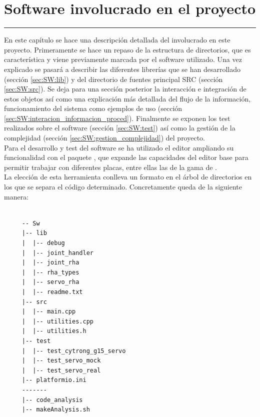 \chapter{Software involucrado en el proyecto} \label{chap:SW}
\hrule
\vspace{3mm}

    En este capítulo se hace una descripción detallada del  involucrado en este proyecto. Primeramente se hace un repaso de la estructura de directorios, que es característica y viene previamente marcada por el software utilizado. Una vez explicado se pasará a describir las diferentes librerías que se han desarrollado (sección \ref{sec:SW:lib}) y del directorio de fuentes principal SRC (sección \ref{sec:SW:src}). Se deja para una sección posterior la interacción e integración de estos objetos así como una explicación más detallada del flujo de la información, funcionamiento del sistema como ejemplos de uso (sección \ref{sec:SW:interacion_informacion_proced}). Finalmente se exponen los test realizados sobre el software (sección \ref{sec:SW:test}) así como la gestión de la complejidad (sección \ref{sec:SW:gestion_complejidad}) del proyecto.
    \\ 

    Para el desarrollo y test del software se ha utilizado el editor  ampliando su funcionalidad con el paquete , que expande las capacidades del editor base para permitir trabajar con diferentes placas, entre ellas las de la gama de .
    \\ 
    
    La elección de esta herramienta conlleva un formato en el árbol de directorios en los que se separa el código determinado. Concretamente queda de la siguiente manera:

    \lstset{language=C, breaklines=true, basicstyle=\footnotesize}
        \begin{lstlisting}[frame=single]
        
     -- Sw
     |-- lib
     |  |-- debug
     |  |-- joint_handler
     |  |-- joint_rha
     |  |-- rha_types
     |  |-- servo_rha
     |  |-- readme.txt
     |-- src  
     |  |-- main.cpp
     |  |-- utilities.cpp
     |  |-- utilities.h
     |-- test
     |  |-- test_cytrong_g15_servo
     |  |-- test_servo_mock
     |  |-- test_servo_real
     |-- platformio.ini
     -------
     |-- code_analysis
     |-- makeAnalysis.sh
        \end{lstlisting}
    
